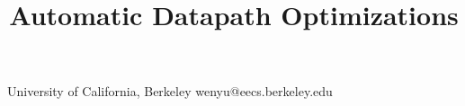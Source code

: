 \documentclass[10pt,nocopyrightspace]{sigplanconf}
\begin{document}
\preprintfooter{}   %

\title{Automatic Datapath Optimizations}
\subtitle{}

           {University of California, Berkeley}
           {wenyu@eecs.berkeley.edu}

\maketitle


\tableofcontents
\setcounter{tocdepth}{2}








\clearpage

\setlength{\bibsep}{0.0pt}
\renewcommand*{\bibfont}{\footnotesize}

\end{document}
